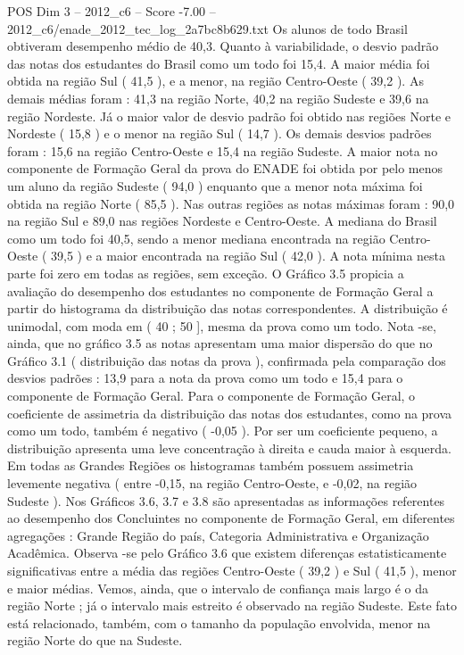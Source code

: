 \begin{textsample}{POS Dim 3 – 2012\_c6 – Score -7.00 – 2012\_c6/enade\_2012\_tec\_log\_2a7bc8b629.txt}
Os alunos de todo Brasil obtiveram desempenho médio de 40,3.
Quanto à variabilidade, o desvio padrão das notas dos estudantes do Brasil como um todo foi 15,4.
A maior média foi obtida na região Sul ( 41,5 ), e a menor, na região Centro-Oeste ( 39,2 ).
As demais médias foram : 41,3 na região Norte, 40,2 na região Sudeste e 39,6 na região Nordeste.
Já o maior valor de desvio padrão foi obtido nas regiões Norte e Nordeste ( 15,8 ) e o menor na região Sul ( 14,7 ).
Os demais desvios padrões foram : 15,6 na região Centro-Oeste e 15,4 na região Sudeste.
A maior nota no componente de Formação Geral da prova do ENADE foi obtida por pelo menos um aluno da região Sudeste ( 94,0 ) enquanto que a menor nota máxima foi obtida na região Norte ( 85,5 ).
Nas outras regiões as notas máximas foram : 90,0 na região Sul e 89,0 nas regiões Nordeste e Centro-Oeste.
A mediana do Brasil como um todo foi 40,5, sendo a menor mediana encontrada na região Centro-Oeste ( 39,5 ) e a maior encontrada na região Sul ( 42,0 ).
A nota mínima nesta parte foi zero em todas as regiões, sem exceção.
O Gráfico 3.5 propicia a avaliação do desempenho dos estudantes no componente de Formação Geral a partir do histograma da distribuição das notas correspondentes.
A distribuição é unimodal, com moda em ( 40 ; 50 ], mesma da prova como um todo.
Nota -se, ainda, que no gráfico 3.5 as notas apresentam uma maior dispersão do que no Gráfico 3.1 ( distribuição das notas da prova ), confirmada pela comparação dos desvios padrões : 13,9 para a nota da prova como um todo e 15,4 para o componente de Formação Geral.
Para o componente de Formação Geral, o coeficiente de assimetria da distribuição das notas dos estudantes, como na prova como um todo, também é negativo ( -0,05 ).
Por ser um coeficiente pequeno, a distribuição apresenta uma leve concentração à direita e cauda maior à esquerda.
Em todas as Grandes Regiões os histogramas também possuem assimetria levemente negativa ( entre -0,15, na região Centro-Oeste, e -0,02, na região Sudeste ).
Nos Gráficos 3.6, 3.7 e 3.8 são apresentadas as informações referentes ao desempenho dos Concluintes no componente de Formação Geral, em diferentes agregações : Grande Região do país, Categoria Administrativa e Organização Acadêmica.
Observa -se pelo Gráfico 3.6 que existem diferenças estatisticamente significativas entre a média das regiões Centro-Oeste ( 39,2 ) e Sul ( 41,5 ), menor e maior médias.
Vemos, ainda, que o intervalo de confiança mais largo é o da região Norte ; já o intervalo mais estreito é observado na região Sudeste.
Este fato está relacionado, também, com o tamanho da população envolvida, menor na região Norte do que na Sudeste.

\end{textsample}
